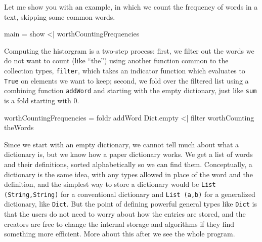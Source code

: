\documentclass[12pt]{amsbook}
\begin{document}
Let me show you with an example,
in which we count the frequency of words in a text, 
skipping some common words.
\begin{code}
main = show <| worthCountingFrequencies
\end{code}
Computing the historgram is a two-step process:
first, we filter out the words we do not want to count (like ``the'')
using another function common to the collection types, \texttt{filter},
which takes an indicator function which evaluates to \texttt{True} on elements we want to keep;
second, we fold over the filtered list using a combining function \texttt{addWord} and starting with the empty dictionary, 
just like \texttt{sum} is a fold starting with $0$.
\begin{code}
worthCountingFrequencies = foldr addWord Dict.empty <| filter worthCounting theWords
\end{code}
Since we start with an empty dictionary, we cannot tell much about what a dictionary is, but we know how a paper dictionary works.
We get a list of words and their definitions, sorted alphabetically so we can find them.
Conceptually, a dictionary is the same idea, with any types allowed in place of the word and the definition,
and the simplest way to store a dictionary would be \texttt{List (String,String)} for a conventional dictionary and \texttt{List (a,b)} for a generalized dictionary, like \texttt{Dict}.
But the point of defining powerful general types like \texttt{Dict} is that the users do not need to worry about how the entries are stored,
and the creators are free to change the internal storage and algorithms if they find something more efficient.
More about this after we see the whole program.
\end{document}
